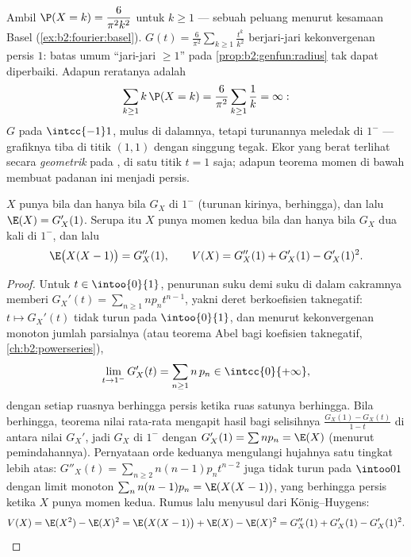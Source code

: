 \begin{example}\label{ex:b2:genfun:heavytail}
Ambil $\P(X = k) = \dfrac{6}{\pi^2k^2}$ untuk $k \geq 1$ --- sebuah
 peluang menurut kesamaan Basel
(\cref{ex:b2:fourier:basel}). 
$G(t) = \frac6{\pi^2}\sum_{k\geq1}\frac{t^k}{k^2}$ berjari-jari
kekonvergenan persis $1$: batas umum ``jari-jari $\geq
1$'' pada \cref{prop:b2:genfun:radius} tak dapat diperbaiki. Adapun
reratanya adalah
\[
\sum_{k\geq1}k\,\P(X = k) =
\frac6{\pi^2}\sum_{k\geq1}\frac1k = \infty :
\]
$G$  pada $\intcc{-1}1$, mulus di dalamnya, tetapi
turunannya meledak di $1^-$ --- grafiknya tiba di
titik $(1, 1)$ dengan singgung tegak. Ekor yang berat terlihat
secara \emph{geometrik} pada , di
satu titik $t = 1$ saja; adapun teorema momen di bawah membuat
padanan ini menjadi persis.
\end{example}

\begin{theorem}\label{thm:b2:genfun:moments}
$X$ punya  bila dan hanya bila $G_X$  di
$1^-$ (turunan kirinya, berhingga), dan lalu $\E(X) = G_X'(1)$.
Serupa itu $X$ punya momen kedua bila dan hanya bila $G_X$ dua kali
 di $1^-$, dan lalu
\[
\E\bigl(X(X - 1)\bigr) = G_X''(1),
\qquad
V(X) = G_X''(1) + G_X'(1) - G_X'(1)^2 .
\]
\end{theorem}

\begin{proof}
Untuk $t \in \intoo{0}{1}$, penurunan suku demi suku di dalam
cakramnya memberi $G_X'(t) = \sum_{n\geq1} np_n t^{n-1}$, yakni deret
berkoefisien taknegatif: $t \mapsto G_X'(t)$ tidak turun pada
$\intoo{0}{1}$, dan menurut kekonvergenan monoton jumlah parsialnya (atau
teorema Abel bagi koefisien taknegatif,
\cref{ch:b2:powerseries}),
\[
\lim_{t \to 1^-} G_X'(t)
= \sum_{n\geq1} n\,p_n \in \intcc{0}{+\infty} ,
\]
dengan setiap ruasnya berhingga persis ketika ruas satunya berhingga. Bila
berhingga, teorema nilai rata-rata mengapit hasil bagi selisihnya
$\frac{G_X(1) - G_X(t)}{1 - t}$ di antara nilai $G_X'$, jadi $G_X$
 di $1^-$ dengan $G_X'(1) = \sum np_n = \E(X)$ (menurut
pemindahannya). Pernyataan orde keduanya mengulangi hujahnya satu tingkat
lebih atas: $G''_X(t) = \sum_{n\geq2}n(n-1)p_nt^{n-2}$ juga
tidak turun pada $\intoo01$ dengan limit monoton
$\sum_nn(n-1)p_n = \E(X(X-1))$, yang berhingga persis ketika $X$ punya
momen kedua. Rumus  lalu menyusul dari
König--Huygens:
\[
V(X) = \E(X^2) - \E(X)^2 = \E\bigl(X(X-1)\bigr) + \E(X) -
\E(X)^2 = G''_X(1) + G'_X(1) - G'_X(1)^2 .
\]
\end{proof}

